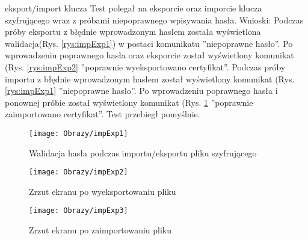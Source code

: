 \begin{enumerate*}
\begin{figure}[ht!]
			
		\end{figure}
		
	\item eksport/import klucza
	Test polegał na eksporcie oraz imporcie klucza szyfrującego wraz z próbami niepoprawnego wpisywania hasła.
	Wnioski: Podczas próby eksportu z błędnie wprowadzonym hasłem została wyświetlona walidacja(Rys. \ref{rys:impExp1}) w postaci komunikatu ''niepoprawne hasło''. Po wprowadzeniu poprawnego hasła oraz eksporcie został wyświetlony komunikat (Rys. \ref{rys:impExp2} ''poprawnie wyeksportowano certyfikat''. Podczas próby importu z błędnie wprowadzonym hasłem został wyświetlony komunikat (Rys. \ref{rys:impExp1} ''niepoprawne hasło''. Po wprowadzeniu poprawnego hasła i ponownej próbie został wyświetlony komunikat (Rys. \ref{rys:impExp3} ''poprawnie zaimportowano certyfikat''. Test przebiegł pomyślnie.
	
	\begin{figure}[ht!]
		\begin{minipage}{0.2\textwidth}
			\texttt{[image: Obrazy/impExp1]}
			\caption{Walidacja hasła podczas importu/eksportu pliku szyfrującego }
			\label{rys:impExp1}
		\end{minipage}
		\begin{minipage}{0.2\textwidth}
			\texttt{[image: Obrazy/impExp2]}
			\caption{Zrzut ekranu po wyeksportowaniu pliku }
			\label{rys:impExp2}
		\end{minipage}
		
		\begin{minipage}{0.2\textwidth}
			\texttt{[image: Obrazy/impExp3]}
			\caption{Zrzut ekranu po zaimportowaniu pliku }
			\label{rys:impExp3}
		\end{minipage}
	\end{figure}
	
\end{enumerate*}

